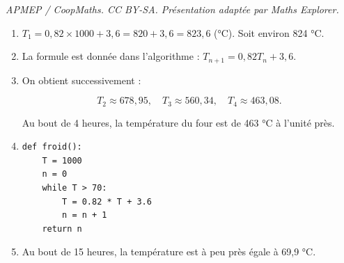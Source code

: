 \documentclass[10pt]{article}
\begin{document}
\noindent\textit{APMEP / CoopMaths. CC BY-SA. Présentation adaptée par Maths Explorer.}\par\medskip
\begin{enumerate}
	\item  \(T_1 = 0,82 \times 1000 + 3,6 = 820 + 3,6 = 823,6\) (°C). Soit environ 824 °C.
	
\item La formule est donnée dans l'algorithme : \(T_{n+1} = 0,82T_n + 3,6\).
	
	\item On obtient successivement :
	
	\[
	T_2 \approx 678,95, \quad T_3 \approx 560,34, \quad T_4 \approx 463,08.
	\]
	
	Au bout de 4 heures, la température du four est de 463 °C à l'unité près.
	
\item \begin{minipage}{7cm}	\begin{lstlisting}[style=python]
def froid():
	T = 1000
	n = 0
	while T > 70:
		T = 0.82 * T + 3.6
        n = n + 1
    return n
\end{lstlisting} \end{minipage}
		
\item Au bout de 15 heures, la température est à peu près égale à 69,9 °C.
\end{enumerate}
\end{document}
